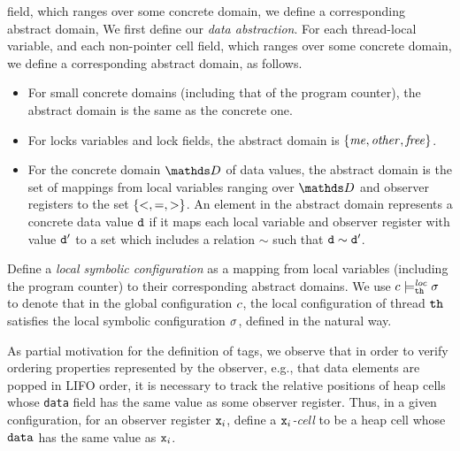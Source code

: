  field, which ranges
over some concrete domain, we define a corresponding abstract domain,
We first define our {\em data abstraction}.
For each thread-local variable, and each non-pointer cell field, which ranges
over some concrete domain, we define a corresponding abstract domain,
as follows.
\begin{itemize}
\item For small concrete domains (including that of the program counter),
  the abstract domain is the same as the concrete one.
\item
  For locks variables and lock fields, the abstract domain is $\left\{\mathit{me},\mathit{other},\mathit{free}\right\}$.
\item For the concrete domain $\ddomain$ of data values, the abstract domain
  is the set of mappings from local variables ranging over $\ddomain$ and
  observer registers to the set $\left\{<,=,>\right\}$.
  An element in the abstract domain represents a concrete data value $\tt d$
  if
    it maps each local variable and observer register with value $\tt d'$
    to a set which includes a relation
    $\sim$ such that $\tt d \sim \tt d'$.
\end{itemize}
Define a {\em local symbolic configuration} as a mapping from local
variables (including the program counter) to their corresponding abstract
domains.
We use $c \models_{{\tt th}}^{\mathit{loc}} \sigma$ to denote that in the
global configuration $c$, the
local configuration of thread ${\tt th}$ satisfies the local symbolic
configuration $\sigma$, defined in the natural way.

As partial motivation for the definition of tags, we
observe that in order to verify ordering properties represented by the
observer, e.g., that data elements are popped in LIFO order, it is necessary to
track the relative positions of heap cells whose {\tt data} field has the same
value as some observer register. Thus,   in a given configuration,
for an observer register $\mathtt{x}_i$,  define a
{\em $\mathtt{x}_i$-cell} to be a heap cell whose
${\tt data}$ has the same value as $\mathtt{x}_i$.

